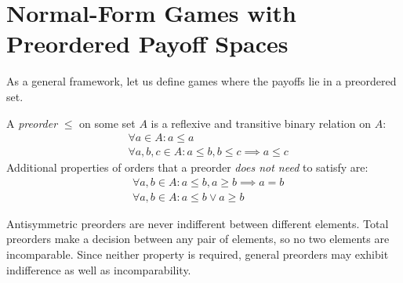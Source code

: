 \documentclass[a4paper]{scrreprt}
\begin{document}
    \section{Normal-Form Games with Preordered Payoff Spaces}
    \label{sec:preorderedPayoffSpaceGames}
    
    As a general framework, let us define games where the payoffs lie in a preordered set.
    \begin{defn}[Preorder]
        A \emph{preorder} $\leq$ on some set $A$ is a reflexive and transitive binary relation on $A$:
        \begin{align*}
            &\forall a \in A: a \leq a \tag{Reflexivity} \\
            &\forall a, b, c \in A: a \leq b, b \leq c \implies a \leq c \tag{Transitivity}
        \end{align*}
        Additional properties of orders that a preorder \emph{does not need} to satisfy are:
        \begin{align*}
            &\forall a, b \in A: a \leq b, a \geq b \implies a = b \tag{Antisymmetry} \\
            &\forall a, b \in A: a \leq b \vee a \geq b \tag{Totality}
        \end{align*}
    \end{defn}
    Antisymmetric preorders are never indifferent between different elements. Total preorders make a decision between any pair of elements, so no two elements are incomparable. Since neither property is required, general preorders may exhibit indifference as well as incomparability.
    
    
    \let\popref\geq
    \let\pononpref\leq
    \let\postrpref>
    \let\postrnonpref<    
\end{document}
